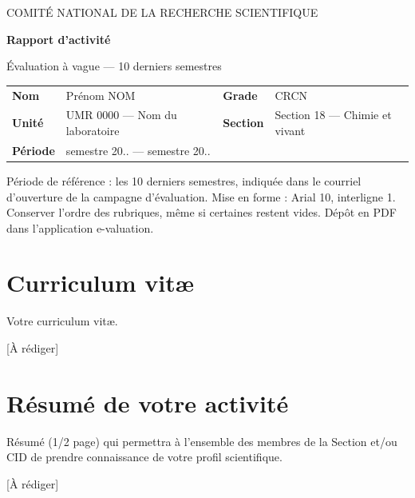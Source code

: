 \documentclass[10pt,a4paper]{article}
\newcommand{\Nom}{Prénom NOM}
\newcommand{\Grade}{CRCN}
\newcommand{\Unite}{UMR 0000 --- Nom du laboratoire}
\newcommand{\SectionCN}{Section 18 --- Chimie et vivant}
\newcommand{\Periode}{semestre 20.. --- semestre 20..}
\newcommand{\arediger}{\textcolor{gris}{[À rédiger]}}
\begin{document}
\begin{tcolorbox}[enhanced, sharp corners, boxrule=0pt, colback=cnrsclair,
    borderline west={4pt}{0pt}{cnrs}, left=14pt, right=10pt, top=10pt, bottom=10pt]
  {\footnotesize\color{cnrs}\MakeUppercase{Comité national de la recherche scientifique}}\par\vspace{3pt}
  {\LARGE\bfseries\color{cnrs}Rapport d'activité}\par\vspace{2pt}
  {\large Évaluation à vague --- 10 derniers semestres}\par\medskip
  {\small
  \begin{tabularx}{\linewidth}{@{}>{\bfseries}l X >{\bfseries}l X@{}}
    Nom & \Nom & Grade & \Grade \\
    Unité & \Unite & Section & \SectionCN \\
    Période & \Periode & & \\
  \end{tabularx}}
\end{tcolorbox}

\begin{consigne}
Période de référence : les 10 derniers semestres, indiquée dans le courriel d'ouverture de la campagne d'évaluation. Mise en forme : Arial 10, interligne 1. Conserver l'ordre des rubriques, même si certaines restent vides. Dépôt en PDF dans l'application e-valuation.
\end{consigne}


\section{Curriculum vitæ}
\begin{consigne}
Votre curriculum vitæ.
\end{consigne}
\arediger %

\section{Résumé de votre activité}
\begin{consigne}
Résumé (1/2 page) qui permettra à l'ensemble des membres de la Section et/ou CID de prendre connaissance de votre profil scientifique.
\end{consigne}
\arediger %
\end{document}

